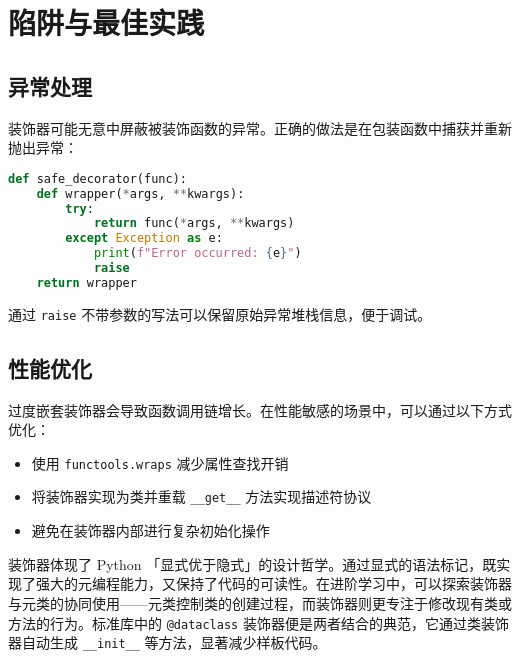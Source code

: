 \chapter{陷阱与最佳实践}
\section{异常处理}
装饰器可能无意中屏蔽被装饰函数的异常。正确的做法是在包装函数中捕获并重新抛出异常：\par
\begin{lstlisting}[language=python]
def safe_decorator(func):
    def wrapper(*args, **kwargs):
        try:
            return func(*args, **kwargs)
        except Exception as e:
            print(f"Error occurred: {e}")
            raise
    return wrapper
\end{lstlisting}
通过 \verb!raise! 不带参数的写法可以保留原始异常堆栈信息，便于调试。\par
\section{性能优化}
过度嵌套装饰器会导致函数调用链增长。在性能敏感的场景中，可以通过以下方式优化：\par
\begin{itemize}
\item 使用 \verb!functools.wraps! 减少属性查找开销
\item 将装饰器实现为类并重载 \verb!__get__! 方法实现描述符协议
\item 避免在装饰器内部进行复杂初始化操作
\end{itemize}
装饰器体现了 Python 「显式优于隐式」的设计哲学。通过显式的语法标记，既实现了强大的元编程能力，又保持了代码的可读性。在进阶学习中，可以探索装饰器与元类的协同使用——元类控制类的创建过程，而装饰器则更专注于修改现有类或方法的行为。标准库中的 \verb!@dataclass! 装饰器便是两者结合的典范，它通过类装饰器自动生成 \verb!__init__! 等方法，显著减少样板代码。\par
